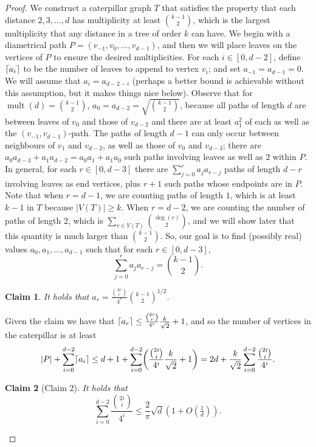\documentclass[12]{article}
\DeclarePairedDelimiter\ceil{\lceil}{\rceil}
\DeclareMathOperator{\mult}{mult}
\newtheorem*{claim}{Claim}
\theoremstyle{definition}
\begin{document}
	\begin{proof}
		We construct a caterpillar graph $T$ that satisfies the property that each distance $2, 3, \ldots, d$ has multiplicity at least ${k-1 \choose 2}$, which is the largest multiplicity that any distance in a tree of order $k$ can have.  We begin with a diametrical path $P = (v_{-1}, v_0, \ldots, v_{d-1})$, and then we will place leaves on the vertices of $P$ to ensure the desired multiplicities.  For each $i \in [0, d-2]$, define $\ceil{a_i}$ to be the number of leaves to append to vertex $v_i$; and set $a_{-1} = a_{d-1} = 0$.  We will assume that $a_i = a_{d-2-i}$ (perhaps a better bound is achievable without this assumption, but it makes things nice below).  Observe that for $\mult(d) = {k-1 \choose 2}$, $a_0 = a_{d-2} = \sqrt{{k-1 \choose 2}}$, because all paths of length $d$ are between leaves of $v_0$ and those of $v_{d-2}$ and there are at least $a_1^2$ of each as well as the $(v_{-1},v_{d-1})$-path.  The paths of length $d-1$ can only occur between neighbours of $v_1$ and $v_{d-2}$, as well as those of $v_0$ and $v_{d-3}$; there are $a_0a_{d-3} + a_1a_{d-2} = a_0a_1 + a_1a_0$ such paths involving leaves as well as $2$ within $P$.  In general, for each $r \in [0,d-3]$ there are $\sum_{j=0}^{r}a_ja_{r-j}$ paths of length $d-r$ involving leaves as end vertices, plus $r+1$ such paths whose endpoints are in $P$.  Note that when $r = d-1$, we are counting paths of length $1$, which is at least $k-1$ in $T$ because $|V(T)| \geq k$.  When $r = d-2$, we are counting the number of paths of length $2$, which is $\sum_{v \in V(T)} {\deg(v) \choose 2}$, and we will show later that this quantity is much larger than ${k-1 \choose 2}$.  So, our goal is to find (possibly real) values $a_0, a_1, \ldots, a_{d-1}$ such that for each $r \in [0,d-3]$, $$\sum_{j=0}^{r}a_ja_{r-j} = {k-1 \choose 2}.$$
		
		\begin{claim}
			It holds that $a_r = \frac{{2r \choose r}}{4^r} {k-1 \choose 2}^{1/2}$.
		\end{claim}
	
		Given the claim we have that $\ceil{a_r} \leq \frac{{2r \choose r}}{4^r} \frac{k}{\sqrt{2}} + 1$, and so the number of vertices in the caterpillar is at least 
			$$|P| + \sum_{i = 0}^{d-2}\ceil{a_i} \leq d+1 + \sum_{i=0}^{d-2} \biggr(\frac{{2i \choose i}}{4^i} \frac{k}{\sqrt{2}} + 1 \biggr) = 2d + \frac{k}{\sqrt{2}}\sum_{i=0}^{d-2} \frac{{2i \choose i}}{4^i}.$$
		
		\begin{claim}[Claim 2]
			It holds that 
			$$\sum_{i=0}^{d-2} \frac{{2i \choose i}}{4^i} \leq \frac{2}{\pi}\sqrt{d}(1+O(\tfrac{1}{d})).$$
		\end{claim}
		

\end{proof}
\end{document}
